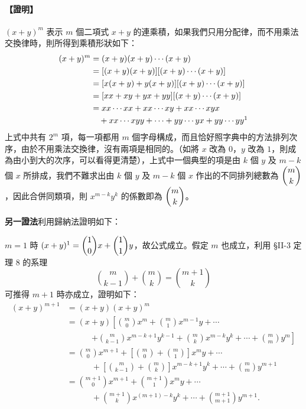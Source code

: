 \paragraph{【證明】}
$(x + y)^m$ 表示 $m$ 個二項式 $x + y$ 的連乘積，如果我們只用分配律，而不用乘法交換律時，則所得到乘積形狀如下：
\begin{align*}
(x + y)^m &= (x + y)(x + y)\dotsb(x + y) \\
&= [(x + y)(x + y)][(x + y)\dotsb(x + y)] \\
&= [x(x + y) + y(x + y)][(x + y)\dotsb(x + y)] \\
&= [xx + xy + yx + yy][(x + y)\dotsb(x + y)] \\
&= xx\dotsb xx + xx\dotsb xy + xx\dotsb xyx \\
&\quad + xx\dotsb xyy + \dotsb + yy\dotsb yx + yy\dotsb yy\footnotemark
\end{align*}
\label{note:b5-ch2-p85-expand}
上式中共有 $2^m$ 項，每一項都用 $m$ 個字母構成，而且恰好照字典中的方法排列次序，由於不用乘法交換律，沒有兩項是相同的。（如將 $x$ 改為 $0$，$y$ 改為 $1$，則成為由小到大的次序，可以看得更清楚），上式中一個典型的項是由 $k$ 個 $y$ 及 $m - k$ 個 $x$ 所排成，我們不難求出由 $k$ 個 $y$ 及 $m - k$ 個 $x$ 作出的不同排列總數為 $\dbinom{m}{k}$，因此合併同類項，則 $x^{m-k} y^k$ 的係數即為 $\dbinom{m}{k}$。

\medskip
\noindent\textbf{另一證法}\quad 利用歸納法證明如下：

$m = 1$ 時 $(x + y)^1 = \dbinom{1}{0} x + \dbinom{1}{1} y$，故公式成立。假定 $m$ 也成立，利用 \S II-3 定理 8 的系理
\[ \binom{m}{k-1} + \binom{m}{k} = \binom{m+1}{k} \]
可推得 $m+1$ 時亦成立，證明如下：
\begin{align*}
(x + y)^{m+1} &= (x + y)(x + y)^m \\
&= (x + y) \left[ \binom{m}{0} x^m + \binom{m}{1} x^{m-1} y + \dotsb \right. \\
&\qquad\quad \left. + \binom{m}{k-1} x^{m-k+1} y^{k-1} + \binom{m}{k} x^{m-k} y^k + \dotsb + \binom{m}{m} y^m \right] \\
&= \binom{m}{0} x^{m+1} + \left[ \binom{m}{0} + \binom{m}{1} \right] x^m y + \dotsb \\
&\qquad\quad + \left[ \binom{m}{k-1} + \binom{m}{k} \right] x^{m-k+1} y^k + \dotsb + \binom{m}{m} y^{m+1} \\
&= \binom{m+1}{0} x^{m+1} + \binom{m+1}{1} x^m y + \dotsb \\
&\qquad\quad + \binom{m+1}{k} x^{(m+1)-k} y^k + \dotsb + \binom{m+1}{m+1} y^{m+1}.
\end{align*}

